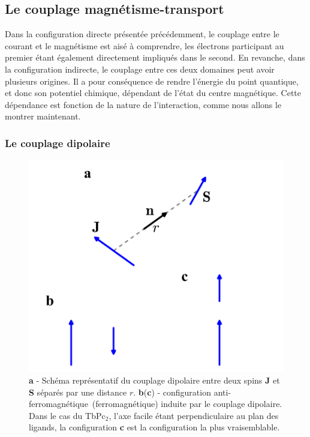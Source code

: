\subsection{Le couplage magnétisme-transport}
Dans la configuration directe présentée précédemment, le couplage entre le courant et le magnétisme est aisé à comprendre, les électrons participant au premier étant également directement impliqués dans le second. En revanche, dans la configuration indirecte, le couplage entre ces deux domaines peut avoir plusieurs origines. Il a pour conséquence de rendre l'énergie du point quantique, et donc son potentiel chimique, dépendant de l'état du centre magnétique. Cette dépendance est fonction de la nature de l'interaction, comme nous allons le montrer maintenant.

\subsubsection{Le couplage dipolaire}

\begin{figure}
\parbox{6.5cm}{
\includegraphics[scale=0.45]{Resultats/CDipolaire/CDipolaire.pdf} 
}
\parbox{7cm}{\caption{\textbf{a} - Schéma représentatif du couplage dipolaire entre deux spins \textbf{J} et \textbf{S} séparés par une distance $r$. \textbf{b}(\textbf{c}) - configuration anti-ferromagnétique~(ferromagnétique) induite par le couplage dipolaire. Dans le cas du TbPc$_2$, l'axe facile étant perpendiculaire au plan des ligands, la configuration \textbf{c} est la configuration la plus vraisemblable.}
\label{dipolaire}
}
\end{figure}


